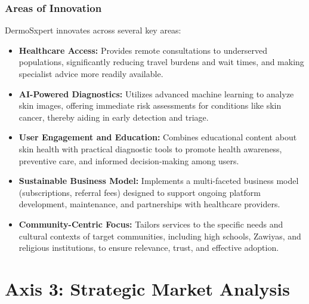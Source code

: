 \subsection{Areas of Innovation}
DermoSxpert innovates across several key areas:
\begin{itemize}
  \item \textbf{Healthcare Access:} Provides remote consultations to underserved populations, significantly reducing travel burdens and wait times, and making specialist advice more readily available.
  \item \textbf{AI-Powered Diagnostics:} Utilizes advanced machine learning to analyze skin images, offering immediate risk assessments for conditions like skin cancer, thereby aiding in early detection and triage.
  \item \textbf{User Engagement and Education:} Combines educational content about skin health with practical diagnostic tools to promote health awareness, preventive care, and informed decision-making among users.
  \item \textbf{Sustainable Business Model:} Implements a multi-faceted business model (subscriptions, referral fees) designed to support ongoing platform development, maintenance, and partnerships with healthcare providers.
  \item \textbf{Community-Centric Focus:} Tailors services to the specific needs and cultural contexts of target communities, including high schools, Zawiyas, and religious institutions, to ensure relevance, trust, and effective adoption.
\end{itemize}

\chapter{Axis 3: Strategic Market Analysis}

